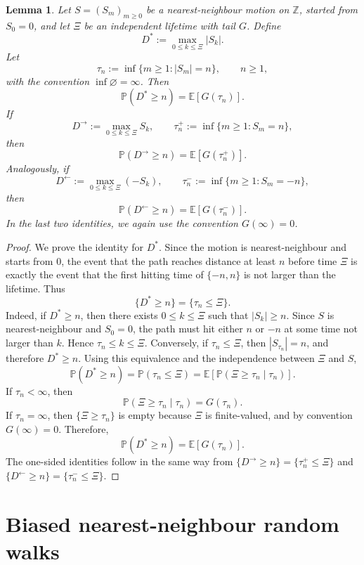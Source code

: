 \documentclass[reqno,final,11pt]{amsart}
\newcommand{\E}{\mathbb E}
\newcommand{\Pbb}{\mathbb P}
\theoremstyle{plain}
\newtheorem{lemma}[theorem]{Lemma}
\theoremstyle{definition}
\theoremstyle{remark}
\numberwithin{equation}{section}
\begin{document}
\begin{lemma}\label{lem:basic-identity}
Let \(S=(S_m)_{m\ge0}\) be a nearest-neighbour motion on \(\mathbb Z\), started
from \(S_0=0\), and let \(\Xi\) be an independent lifetime with tail \(G\).
Define
\[
  D^*:=\max_{0\le k\le \Xi}|S_k|.
\]
Let
\[
  \tau_n:=\inf\{m\ge1: |S_m|=n\},
  \qquad n\ge1,
\]
with the convention \(\inf\varnothing=\infty\). Then
\[
  \Pbb(D^*\ge n)=\E[G(\tau_n)].
\]
If
\[
  D^\to:=\max_{0\le k\le\Xi}S_k,
  \qquad
  \tau_n^+:=\inf\{m\ge1:S_m=n\},
\]
then
\[
  \Pbb(D^\to\ge n)=\E[G(\tau_n^+)].
\]
Analogously, if
\[
  D^\leftarrow:=\max_{0\le k\le\Xi}(-S_k),
  \qquad
  \tau_n^-:=\inf\{m\ge1:S_m=-n\},
\]
then
\[
  \Pbb(D^\leftarrow\ge n)=\E[G(\tau_n^-)].
\]
In the last two identities, we again use the convention \(G(\infty)=0\).
\end{lemma}



\begin{proof}
We prove the identity for \(D^*\). Since the motion is nearest-neighbour and
starts from \(0\), the event that the path reaches distance at least \(n\)
before time \(\Xi\) is exactly the event that the first hitting time of
\(\{-n,n\}\) is not larger than the lifetime. Thus
\[
\{D^*\ge n\}=\{\tau_n\le \Xi\}.
\]
Indeed, if \(D^*\ge n\), then there exists \(0\le k\le \Xi\) such that
\(|S_k|\ge n\). Since \(S\) is nearest-neighbour and \(S_0=0\), the path
must hit either \(n\) or \(-n\) at some time not larger than \(k\). Hence
\(\tau_n\le k\le \Xi\). Conversely, if \(\tau_n\le \Xi\), then
\(|S_{\tau_n}|=n\), and therefore \(D^*\ge n\).
Using this equivalence and the independence between \(\Xi\) and \(S\),
\[
  \Pbb(D^*\ge n)
  =
  \Pbb(\tau_n\le \Xi)
  =
  \E\left[\Pbb(\Xi\ge \tau_n\mid \tau_n)\right].
\]
If \(\tau_n<\infty\), then
\[
  \Pbb(\Xi\ge \tau_n\mid \tau_n)=G(\tau_n).
\]
If \(\tau_n=\infty\), then \(\{\Xi\ge \tau_n\}\) is empty because
\(\Xi\) is finite-valued, and by convention \(G(\infty)=0\). Therefore,
\[
  \Pbb(D^*\ge n)=\E[G(\tau_n)].
\]
The one-sided identities follow in the same way from
\(\{D^\to\ge n\}=\{\tau_n^+\le \Xi\}\) and
\(\{D^\leftarrow\ge n\}=\{\tau_n^-\le \Xi\}\).
\end{proof}






\section{Biased nearest-neighbour random walks}\label{sec:drift} 
\end{document}
